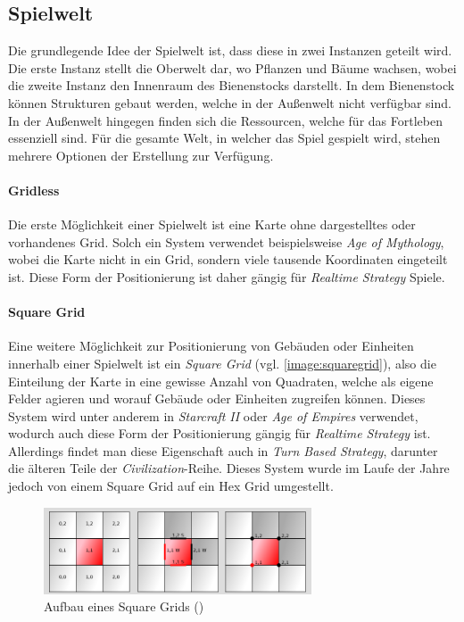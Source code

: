 \subsection{Spielwelt}
Die grundlegende Idee der Spielwelt ist, dass diese in zwei Instanzen geteilt wird. Die erste Instanz stellt die Oberwelt dar, wo Pflanzen und Bäume wachsen, wobei die zweite Instanz den Innenraum des Bienenstocks darstellt. In dem Bienenstock können Strukturen gebaut werden, welche in der Außenwelt nicht verfügbar sind. In der Außenwelt hingegen finden sich die Ressourcen, welche für das Fortleben essenziell sind. Für die gesamte Welt, in welcher das Spiel gespielt wird, stehen mehrere Optionen der Erstellung zur Verfügung.

\paragraph{Gridless}
Die erste Möglichkeit einer Spielwelt ist eine Karte ohne dargestelltes oder vorhandenes Grid. Solch ein System verwendet beispielsweise \textit{Age of Mythology}, wobei die Karte nicht in ein Grid, sondern viele tausende  Koordinaten eingeteilt ist. Diese Form der Positionierung ist daher gängig für \textit{Realtime Strategy} Spiele.

\paragraph{Square Grid}
Eine weitere Möglichkeit zur Positionierung von Gebäuden oder Einheiten innerhalb einer Spielwelt ist ein \textit{Square Grid} (vgl. \autoref{image:squaregrid}), also die Einteilung der Karte in eine gewisse Anzahl von Quadraten, welche als eigene Felder agieren und worauf Gebäude oder Einheiten zugreifen können. Dieses System wird unter anderem in \textit{Starcraft II} oder \textit{Age of Empires} verwendet, wodurch auch diese Form der Positionierung gängig für \textit{Realtime Strategy} ist. Allerdings findet man diese Eigenschaft auch in \textit{Turn Based Strategy}, darunter die älteren Teile der \textit{Civilization}-Reihe. Dieses System wurde im Laufe der Jahre jedoch von einem Square Grid auf ein Hex Grid umgestellt.

\begin{figure}
    \begin{center}
        \includegraphics[width=300px]{0.bilder/squaregrid.png}
    \end{center}
    \caption{Aufbau eines Square Grids (\cite{world:grids})} \label{image:squaregrid}
\end{figure}

